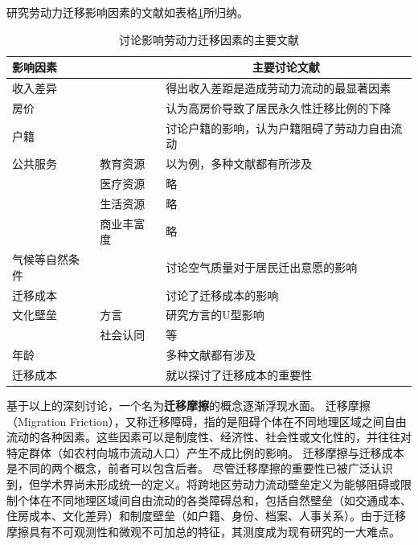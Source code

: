 \documentclass[a4paper,12pt,oneside, fontset=mac]{ctexbook} %
\begin{document}
研究劳动力迁移影响因素的文献如表格\ref{tab:影响劳动力迁移的因素}所归纳。

\begin{table}[!ht]
\centering
\caption{讨论影响劳动力迁移因素的主要文献}
\begin{tabularx}{\textwidth}{@{}llX@{}}
\toprule
\textbf{影响因素} &  & \multicolumn{1}{c}{\textbf{主要讨论文献}} \\ 
\midrule
收入差异 &  &  \cite{kennanEffectExpectedIncome2011}得出收入差距是造成劳动力流动的最显著因素\\
房价 &  &  \cite{ZhangLiFangJieRuHeYingXiangLaoDongLiLiuDong2017}认为高房价导致了居民永久性迁移比例的下降\\
户籍 &  & \cite{ngaiChinasMobilityBarriers2019}讨论户籍的影响，认为户籍阻碍了劳动力自由流动\\
公共服务 &  教育资源&  以\cite{XiaYiRanChengShiJianDeMengMuSanQianGongGongFuWuYingXiangLaoDongLiLiuXiangDeJingYanYanJiu2015}为例，多种文献都有所涉及\\
  & 医疗资源 & 略\\
  & 生活资源 & 略\\
  & 商业丰富度 & 略\\
气候等自然条件 &  &  \cite{HongDaYongDiWeiChaiYiGuaYingXingYuJiXiaoQiDaiKongQiWuRanYouZhiDeJuMinQianChuYiXiangFenYiYanJiu2016}讨论空气质量对于居民迁出意愿的影响\\
迁移成本 &  &  \cite{WangLiLiWoGuoRenKouQianYiChengBenChengShiGuiMoYuShengChanLu2020}讨论了迁移成本的影响\\
文化壁垒 & 方言 &  \cite{LiuYuYunLaoDongLiKuaFangYanLiuDongDeDaoUXingMoShi2015}研究方言的U型影响\\
  & 社会认同 &  \cite{ZhangWenHongChengShiXinYiMinSheHuiRenTongDeJieGouMoXing2009}等\\
年龄 & & 多种文献都有涉及\\
迁移成本 & & \cite{todaroModelLaborMigration1969}就以探讨了迁移成本的重要性\\
\bottomrule
\end{tabularx}
\label{tab:影响劳动力迁移的因素}
\end{table}

基于以上的深刻讨论，一个名为\textbf{迁移摩擦}的概念逐渐浮现水面。
迁移摩擦（Migration Friction），又称迁移障碍，指的是阻碍个体在不同地理区域之间自由流动的各种因素。这些因素可以是制度性、经济性、社会性或文化性的，并往往对特定群体（如农村向城市流动人口）产生不成比例的影响。
迁移摩擦与迁移成本是不同的两个概念，前者可以包含后者。
尽管迁移摩擦的重要性已被广泛认识到，但学术界尚未形成统一的定义。\cite{JiangWeiZhongGuoKuaDiQuLaoDongLiLiuDongBiLeiCeDuFangFaYanJinQuShiYuJueDingYinSu2024}将跨地区劳动力流动壁垒定义为能够阻碍或限制个体在不同地理区域间自由流动的各类障碍总和，包括自然壁垒（如交通成本、住房成本、文化差异）和制度壁垒（如户籍、身份、档案、人事关系）。由于迁移摩擦具有不可观测性和微观不可加总的特征，其测度成为现有研究的一大难点。
\end{document}
